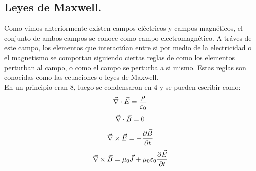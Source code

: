\documentclass[11pt]{article}
\begin{document}
\subsection{Leyes de Maxwell.}\label{sec:Leyes de Maxwell}
Como vimos anteriormente existen campos eléctricos y campos magnéticos, el conjunto de ambos campos se conoce como campo electromagnético. A tráves de este campo, los elementos que interactúan entre si por medio de la electricidad o el magnetismo se comportan siguiendo ciertas reglas de como los elementos perturban al campo, o como el campo se perturba a si mismo. Estas reglas son conocidas como las ecuaciones o leyes de Maxwell.\\
En un principio eran 8, luego se condensaron en 4 y se pueden escribir como: 
\begin{equation}
\label{eq:maxwell1}
\vec {\nabla} \cdot\vec{E}=\frac{\rho}{\varepsilon_0}\\
\end{equation}
\begin{equation}
\label{eq:maxwell2}
\vec {\nabla} \cdot\vec{B}=0\\
\end{equation}
\begin{equation}
\label{eq:maxwell3}
\vec {\nabla} \times\vec{E}=-\frac{\partial \vec{B}}{\partial t}\\
\end{equation}
\begin{equation}
\label{eq:maxwell4}
\vec {\nabla} \times\vec{B}=\mu_0\vec{J}+\mu_0\varepsilon_0\frac{\partial \vec{E}}{\partial t}\\
\end{equation}
\end{document}
